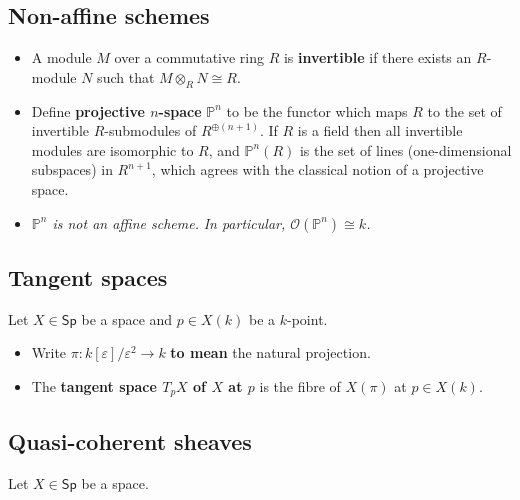 \documentclass[10pt]{article}
\newcommand{\pee}{\mathbb{P}}
\newcommand{\Sp}{\mathsf{Sp}}
\begin{document}
        \subsection{Non-affine schemes}

            \begin{itemize}
                \item A module $M$ over a commutative ring $R$ is \textbf{invertible} if there exists an $R$-module $N$ such that $M\otimes_R N\cong R$.
                \item Define \textbf{projective $n$-space} $\pee^n$ to be the functor which maps $R$ to the set of invertible $R$-submodules of $R^{\oplus(n+1)}$.
                    If $R$ is a field then all invertible modules are isomorphic to $R$, and $\pee^n(R)$ is the set of lines (one-dimensional subspaces) in $R^{n+1}$, which agrees with the classical notion of a projective space.
                \item \emph{$\pee^n$ is not an affine scheme.}
                    \emph{In particular, $\mathcal{O}(\pee^n)\cong k$.}
            \end{itemize}

        \subsection{Tangent spaces}

            Let $X\in\Sp$ be a space and $p\in X(k)$ be a $k$-point.

            \begin{itemize}
                \item Write $\pi\colon k[\varepsilon]/\varepsilon^2\to k$ \textbf{to mean} the natural projection.
                \item The \textbf{tangent space $T_pX$ of $X$ at $p$} is the fibre of $X(\pi)$ at $p\in X(k)$.
            \end{itemize}

        \subsection{Quasi-coherent sheaves}

            Let $X\in\Sp$ be a space.
\end{document}
